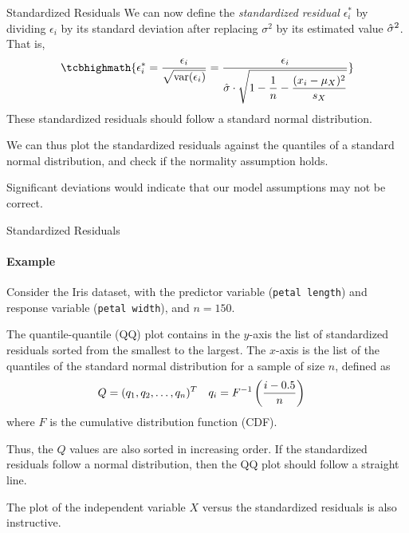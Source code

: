 %
\begin{frame}{Standardized Residuals}
We can now define the {\em standardized residual} $\epsilon_i^*$ by dividing $\epsilon_i$ by its
standard deviation after replacing $\sigma^2$ by its estimated value
$\hat{\sigma}^2$. That is,
\begin{align*}
    \tcbhighmath{
    \epsilon_i^* = \frac{\epsilon_i}{\sqrt{\var(\epsilon_i)}} =
    \frac{\epsilon_i}{\displaystyle \hsigma \cdot \sqrt{1 - \frac{1}{n} -
    \frac{(x_i-\mu_X)^2}{s_X}}}
}
\end{align*}
These standardized residuals should follow a standard normal
distribution. 

\medskip


	We can thus plot the standardized residuals 
against the quantiles of a standard
normal distribution, and check if the normality assumption holds.

\medskip

Significant deviations would indicate that our model assumptions may not
be correct.
\end{frame}

\begin{frame}{Standardized Residuals}
\framesubtitle{Example}
    Consider the Iris dataset, %
    with the predictor variable ({\tt petal length}) and response
    variable ({\tt petal width}), and $n=150$.

	\medskip

The quantile-quantile (QQ) plot contains in 
the $y$-axis the list of standardized residuals sorted from the
    smallest to the largest. The
    $x$-axis is the list of the quantiles of the standard 
    normal distribution for a sample
    of size $n$, defined as
    \begin{align*}
	    Q & = (q_1, q_2, \ldots, q_n)^T &
        q_i & = F^{-1}\left(\frac{i-0.5}{n}\right)
    \end{align*}
    where $F$ is the cumulative distribution function (CDF).

	\medskip

    Thus, the $Q$ values are also sorted in increasing order.%
	If the standardized residuals follow a normal
    distribution, then the QQ plot should follow a straight line.
%

	\medskip

    The plot of the independent variable $X$ versus the standardized
    residuals is also instructive. %

\end{frame}

